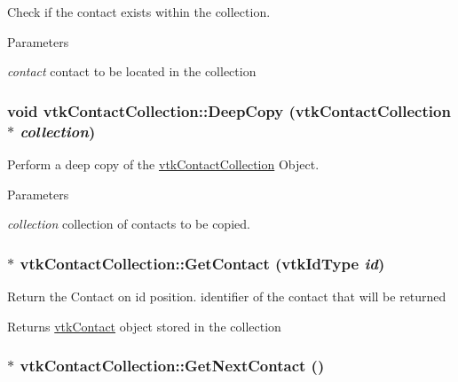 Check if the contact exists within the collection. 
\begin{DoxyParams}{Parameters}
\item[{\em contact}]contact to be located in the collection \end{DoxyParams}
\hypertarget{classvtkContactCollection_ac35b5e32c81e6f21e4115591b282489a}{
\subsubsection[{DeepCopy}]{\setlength{\rightskip}{0pt plus 5cm}void vtkContactCollection::DeepCopy ({\bf vtkContactCollection} $\ast$ {\em collection})}}
\label{classvtkContactCollection_ac35b5e32c81e6f21e4115591b282489a}


Perform a deep copy of the \hyperlink{classvtkContactCollection}{vtkContactCollection} Object. 
\begin{DoxyParams}{Parameters}
\item[{\em collection}]collection of contacts to be copied. \end{DoxyParams}
\hypertarget{classvtkContactCollection_a0f3dcad137c9a1d088c1ca6585c2120c}{
\subsubsection[{GetContact}]{ $\ast$ vtkContactCollection::GetContact (vtkIdType {\em id})}}
\label{classvtkContactCollection_a0f3dcad137c9a1d088c1ca6585c2120c}


Return the Contact on id position. identifier of the contact that will be returned \begin{DoxyReturn}{Returns}
\hyperlink{classvtkContact}{vtkContact} object stored in the collection 
\end{DoxyReturn}
\hypertarget{classvtkContactCollection_a4e9a9f6aec44e28433aaa02bb7aca941}{
\subsubsection[{GetNextContact}]{ $\ast$ vtkContactCollection::GetNextContact ()}}
\label{classvtkContactCollection_a4e9a9f6aec44e28433aaa02bb7aca941}


